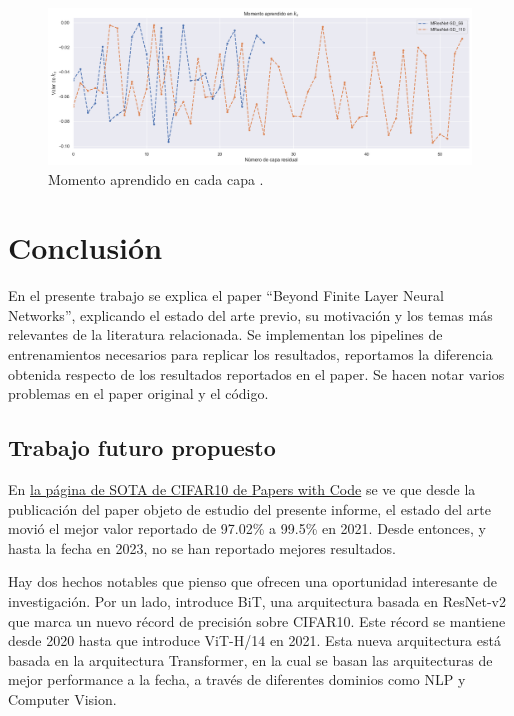 \documentclass[titlepage,a4paper,oneside]{article}
\begin{document}
\begin{figure}[H]
\centering
\includegraphics[width=\textwidth]{images/momentum_sd.png}
\caption{Momento aprendido en cada capa .}
\label{sd_momentum}
\end{figure}


\section{Conclusión}
En el presente trabajo se explica el paper ``Beyond Finite Layer Neural Networks'', explicando el estado del arte previo, su motivación y los temas más relevantes de la literatura relacionada. Se implementan los pipelines de entrenamientos necesarios para replicar los resultados, reportamos la diferencia obtenida respecto de los resultados reportados en el paper. Se hacen notar varios problemas en el paper original y el código.

\subsection{Trabajo futuro propuesto}
En \href{https://paperswithcode.com/sota/image-classification-on-cifar-10}{la página de SOTA de CIFAR10 de Papers with Code} se ve que desde la publicación del paper objeto de estudio del presente informe, el estado del arte movió el mejor valor reportado de 97.02\% a 99.5\% en 2021. Desde entonces, y hasta la fecha en 2023, no se han reportado mejores resultados.

Hay dos hechos notables que pienso que ofrecen una oportunidad interesante de investigación. Por un lado, \cite{kolesnikov2020big} introduce BiT, una arquitectura basada en ResNet-v2 que marca un nuevo récord de precisión sobre CIFAR10. Este récord se mantiene desde 2020 hasta que \cite{dosovitskiy2021image} introduce ViT-H/14 en 2021. Esta nueva arquitectura está basada en \cite{vaswani2023attention} la arquitectura Transformer, en la cual se basan las arquitecturas de mejor performance a la fecha, a través de diferentes dominios como NLP y Computer Vision.
\end{document}
